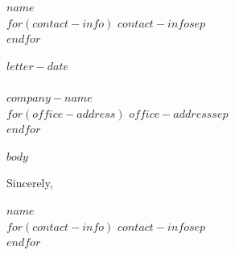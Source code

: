 \documentclass[$if(fontsize)$$fontsize$$else$10pt$endif$,letterpaper]{article}
\def\name{$name$}
\begin{document}
\begin{flushright}


{
\begin{minipage}[t]{0.495\textwidth}
\raggedleft
{\large\rmfamily\scshape\itshape \name} \\

$for(contact-info)$
  $contact-info$$sep$ \\
$endfor$
\end{minipage} %

}
\end{flushright}

\selectfont
{
$letter-date$ \\ \\
\textbf{$company-name$} \\
$for(office-address)$ $office-address$$sep$ \\ $endfor$

}

{
\bigskip

$body$


\bigskip\bigskip
Sincerely,
\bigskip

{\name} \\
$for(contact-info)$
  $contact-info$$sep$ \\
$endfor$


}
\end{document}
